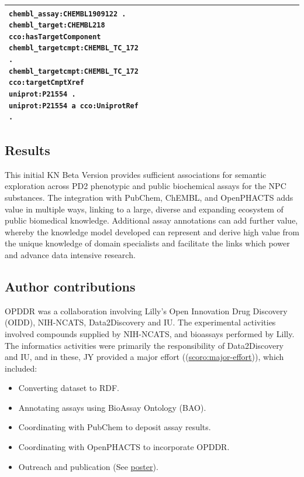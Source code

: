 \begin{singlespace}
\begin{longtable}{p{0.4\linewidth}p{0.6\linewidth}}
{\texttt{chembl\_assay:CHEMBL1909122 .}\\ \texttt{chembl\_target:CHEMBL218}\\
\texttt{cco:hasTargetComponent}\\ \texttt{chembl\_targetcmpt:CHEMBL\_TC\_172 .}\\ \texttt{chembl\_targetcmpt:CHEMBL\_TC\_172}\\ \texttt{cco:targetCmptXref}\\ \texttt{uniprot:P21554 .}\\ \texttt{uniprot:P21554 a cco:UniprotRef . }} \\
\hline
\end{longtable}
\end{singlespace}

\subsection{Results}

This initial KN Beta Version provides sufficient associations for semantic exploration across PD2 phenotypic and public biochemical assays for the NPC substances.  The integration with PubChem, ChEMBL, and OpenPHACTS adds value in multiple ways, linking to a large, diverse and expanding ecosystem of public biomedical knowledge.  Additional assay annotations can add further value, whereby the knowledge model developed can represent and derive high value from the unique knowledge of domain specialists and facilitate the links which power and advance data intensive research.

\subsection{Author contributions}

OPDDR was a collaboration involving Lilly's Open Innovation Drug Discovery (OIDD), NIH-NCATS, Data2Discovery and IU. The experimental activities involved compounds supplied by NIH-NCATS, and bioassays performed by Lilly. The informatics activities were primarily the responsibility of Data2Discovery and IU, and in these, JY provided a major effort ((\href{http://purl.org/spar/scoro/major-effort}{scoro:major-effort})), which included: 

\begin{itemize}
    \item Converting dataset to RDF.
    \item Annotating assays using BioAssay Ontology (BAO).
    \item Coordinating with PubChem to deposit assay results.
    \item Coordinating with OpenPHACTS to incorporate OPDDR.
    \item Outreach and publication (See \href{https://zenodo.org/record/4844529}{poster}).
\end{itemize}

